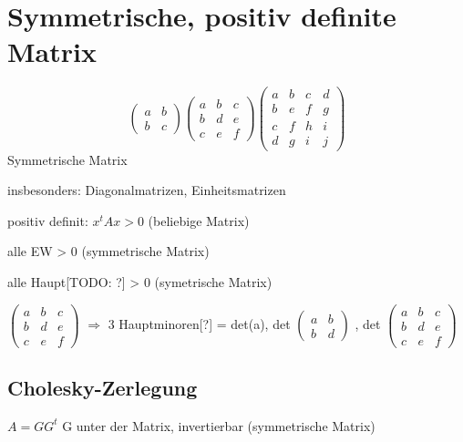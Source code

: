 \documentclass[12pt,a4paper]{article} %
\begin{document}
	\newpage
	
	\section{Symmetrische, positiv definite Matrix}
	
	\begin{equation*}
		\begin{pmatrix}
			a & b \\
			b & c 
		\end{pmatrix}
		\begin{pmatrix}
			a & b & c \\
			b & d & e \\
			c & e & f
		\end{pmatrix}
		\begin{pmatrix}
			a & b & c & d \\
			b & e & f & g \\
			c & f & h & i \\
			d & g & i & j
		\end{pmatrix}
	\end{equation*}
	Symmetrische Matrix
	
	
	insbesonders: Diagonalmatrizen, Einheitsmatrizen
	
	positiv definit: $x^t Ax > 0$ (beliebige Matrix)
	
	alle EW > 0 (symmetrische Matrix)
	
	alle Haupt[TODO: ?] > 0 (symetrische Matrix)
	
	$\begin{pmatrix}
		a & b & c \\
		b & d & e \\
		c & e & f
	\end{pmatrix}$
 	$\Rightarrow$ 3 Hauptminoren[?] = det(a), det
 	$\begin{pmatrix}
	 	a & b \\
	 	b & d 
 	\end{pmatrix}$
 	, det
 	$\begin{pmatrix}
 	a & b & c \\
 	b & d & e \\
 	c & e & f
 	\end{pmatrix}$
	
	\subsection{Cholesky-Zerlegung}
	$A = GG^t$ G unter der Matrix, invertierbar (symmetrische Matrix)
	
\end{document}
